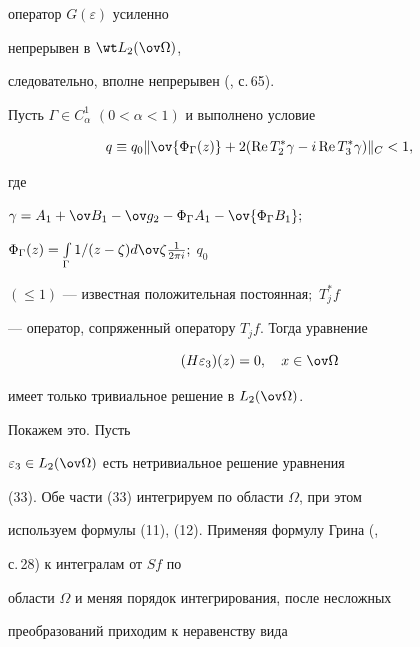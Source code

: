оператор $G(\varepsilon)$ усиленно 


непрерывен в $\wt L_2(\ov\Omega)$, 


следовательно, вполне непрерывен (\cite{1}, с.\,65). 


 


\begin{lem} 


Пусть $\Gamma\in C^1_\alpha$ $(0<\alpha<1)$ и выполнено условие 


\begin{equation} 


q\equiv q_0\|\ov{\Phi_\Gamma(z)}+2(\re T^*_2\gamma- 


i\re T^*_3\gamma)\|_C<1, 


\end{equation} 


где 


$\gamma=A_1+\ov B_1-\ov g_2-\Phi_\Gamma A_1-\ov{\Phi_\Gamma B_1};$ 


$\Phi_\Gamma(z)=\int\limits_\Gamma 1/(z-\zeta)d\ov\zeta 


\frac{1}{2\pi i};$ $q_0$ 


$(\le 1)$ --- известная положительная постоянная$;$ $T^*_jf$ 


--- оператор, сопряженный оператору $T_jf$. Тогда уравнение 


\begin{equation} 


(H\varepsilon_3)(z)=0,\quad x\in\ov\Omega 


\end{equation} 


имеет только тривиальное решение в $L_2(\ov\Omega)$. 


\end{lem} 


 


Покажем это. Пусть 


$\varepsilon_3\in L_2(\ov\Omega)$ есть нетривиальное решение уравнения 


(33). Обе части (33) интегрируем по области $\Omega$, при этом 


используем формулы (11), (12). Применяя формулу Грина (\cite{3}, 


с.\,28) к интегралам от $Sf$ по 


области $\Omega$ и меняя порядок интегрирования, после несложных 


преобразований приходим к неравенству вида 


